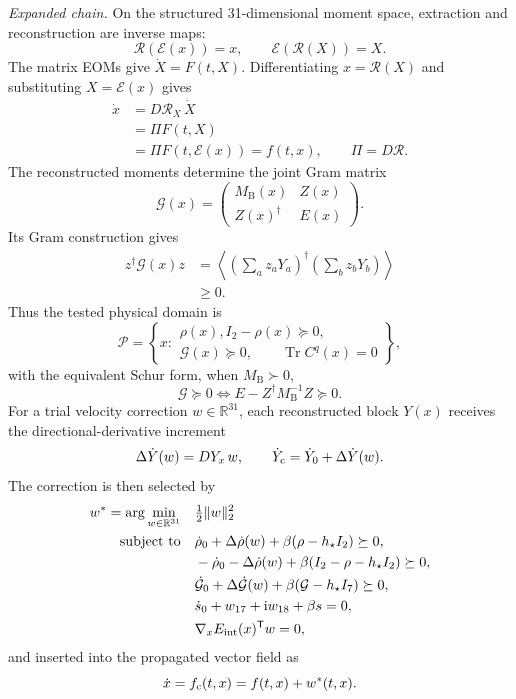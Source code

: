 \documentclass[10pt,twocolumn]{article}
\newcommand{\ii}{\mathrm i}
\newcommand{\R}{\mathbb R}
\newcommand{\I}{I}
\newcommand{\Tr}{\operatorname{Tr}}
\newcommand{\norm}[1]{\lVert#1\rVert}
\begin{document}
\noindent\textit{Expanded chain.}
On the structured 31-dimensional moment space, extraction and reconstruction
are inverse maps:
\[
\mathcal R(\mathcal E(x))=x,
\qquad
\mathcal E(\mathcal R(X))=X.
\]
The matrix EOMs give $\dot X=F(t,X)$.  Differentiating
$x=\mathcal R(X)$ and substituting $X=\mathcal E(x)$ gives
\[
\begin{aligned}
\dot x
&=D\mathcal R_X\,\dot X\\
&=\Pi F(t,X)\\
&=\Pi F\!\left(t,\mathcal E(x)\right)
=f(t,x),
\qquad \Pi=D\mathcal R.
\end{aligned}
\]
The reconstructed moments determine the joint Gram matrix
\[
\mathcal G(x)=
\begin{pmatrix}
M_{\mathrm B}(x)&Z(x)\\
Z(x)^\dagger&E(x)
\end{pmatrix}.
\]
Its Gram construction gives
\[
\begin{aligned}
z^\dagger\mathcal G(x)z
&=\left\langle
\left(\sum_a z_aY_a\right)^\dagger
\left(\sum_b z_bY_b\right)
\right\rangle\\
&\geq0.
\end{aligned}
\]
Thus the tested physical domain is
\[
\mathcal P=
\left\{x:\begin{gathered}
\rho(x),\I_2-\rho(x)\succeq0,\\
\mathcal G(x)\succeq0,\qquad \Tr C^q(x)=0
\end{gathered}
\right\},
\]
with the equivalent Schur form, when $M_{\mathrm B}\succ0$,
\[
\mathcal G\succeq0
\Longleftrightarrow
E-Z^\dagger M_{\mathrm B}^{-1}Z\succeq0.
\]
For a trial velocity correction $w\in\R^{31}$, each reconstructed block
$Y(x)$ receives the directional-derivative increment
\[
\Delta\dot Y(w)
=DY_x\,w,
\qquad
\dot Y_{\rm c}=\dot Y_0+\Delta\dot Y(w).
\]
The correction is then selected by
{\footnotesize
\[
\begin{aligned}
w^*=\arg\min_{w\in\R^{31}}\quad&\tfrac12\norm{w}_2^2\\
\text{subject to}\quad
&\dot\rho_0+\Delta\dot\rho(w)
  +\beta(\rho-h_\star\I_2)\succeq0,\\
&-\dot\rho_0-\Delta\dot\rho(w)
  +\beta(\I_2-\rho-h_\star\I_2)\succeq0,\\
&\dot{\mathcal G}_0+\Delta\dot{\mathcal G}(w)
  +\beta(\mathcal G-h_\star\I_7)\succeq0,\\
&\dot s_0+w_{17}+\ii w_{18}+\beta s=0,\\
&\nabla_xE_{\rm int}(x)^{\mathsf T}w=0,
\end{aligned}
\]}
and inserted into the propagated vector field as
\[
\dot x=f_{\rm c}(t,x)=f(t,x)+w^*(t,x).
\]
\end{document}
